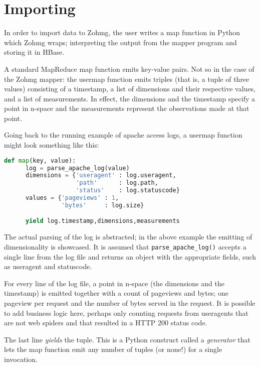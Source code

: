 \section{Importing}

In order to import data to Zohmg, the user writes a map function in Python which
Zohmg wraps; interpreting the output from the mapper program and storing it in
HBase.

A standard MapReduce map function emits key-value pairs. Not so in the case of
the Zohmg mapper: the usermap function emits triples (that is, a tuple of three
values) consisting of a timestamp, a list of dimensions and their respective
values, and a list of measurements. In effect, the dimensions and the timestamp
specify a point in n-space and the measurements represent the observations made
at that point.

Going back to the running example of apache access logs, a usermap function
might look something like this:

\vspace{12pt}

\begin{lstlisting}[language=Python]
   def map(key, value):
      log = parse_apache_log(value)
      dimensions = {'useragent' : log.useragent,
                    'path'      : log.path,
                    'status'    : log.statuscode}
      values = {'pageviews' : 1,
                'bytes'     : log.size}

      yield log.timestamp,dimensions,measurements
\end{lstlisting}

\vspace{12pt}

The actual parsing of the log is abstracted; in the above example the
emitting of dimensionality is showcased. It is assumed that
\texttt{parse\_apache\_log()} accepts a single line from the log file and
returns an object with the appropriate fields, such as useragent and
statuscode.

For every line of the log file, a point in n-space (the dimensions and the
timestamp) is emitted together with a count of pageviews and bytes; one
pageview per request and the number of bytes served in the request. It is
possible to add business logic here, perhaps only counting requests from
useragents that are not web spiders and that resulted in a HTTP 200 status
code.

The last line \textit{yields} the tuple. This is a Python construct called a
\textit{generator} that lets the map function emit any number of tuples (or
none!) for a single invocation.

